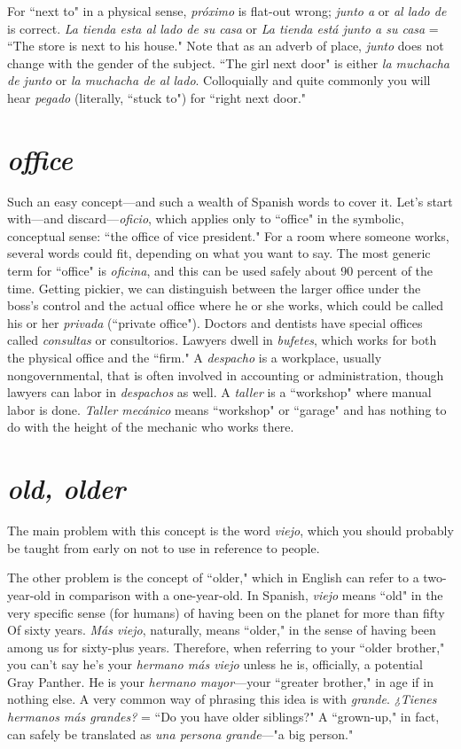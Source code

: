 For ``next to" in a physical sense, \emph{próximo} is flat-out wrong;
\emph{junto a} or \emph{al lado de} is correct. \emph{La tienda esta al lado de su casa} or \emph{La
tienda está junto a su casa} = ``The store is next to his house." Note
that as an adverb of place, \emph{junto} does not change with the gender of
the subject. ``The girl next door" is either \emph{la muchacha de junto} or \emph{la
muchacha de al lado}. Colloquially and quite commonly you will hear
\emph{pegado} (literally, ``stuck to") for ``right next door."

\section{\emph{office}}

Such an easy concept---and such a wealth of Spanish words to
cover it. Let's start with---and discard---\emph{oficio}, which applies only to
``office" in the symbolic, conceptual sense: ``the office of vice president." For a room where someone works, several words could fit, depending on what you want to say. The most generic term for ``office" is
\emph{oficina}, and this can be used safely about 90 percent of the time. Getting pickier, we can distinguish between the larger office under the
boss's control and the actual office where he or she works, which could
be called his or her \emph{privada} (``private office"). Doctors and dentists
have special offices called \emph{consultas} or consultorios. Lawyers dwell in
\emph{bufetes}, which works for both the physical office and the ``firm." A
\emph{despacho} is a workplace, usually nongovernmental, that is often involved in accounting or administration, though lawyers can labor in
\emph{despachos} as well. A \emph{taller} is a ``workshop" where manual labor is
done. \emph{Taller mecánico} means ``workshop" or ``garage" and has nothing
to do with the height of the mechanic who works there.

\section{\emph{old, older}}

The main problem with this concept is the word \emph{viejo}, which
you should probably be taught from early on not to use in reference
to people.

The other problem is the concept of ``older," which in English
can refer to a two-year-old in comparison with a one-year-old. In Spanish, \emph{viejo} means ``old" in the very specific sense (for humans) of having
been on the planet for more than fifty Of sixty years. \emph{Más viejo}, naturally, means ``older," in the sense of having been among us for sixty-plus years. Therefore, when referring to your ``older brother," you can't
say he's your \emph{hermano más viejo} unless he is, officially, a potential
Gray Panther. He is your \emph{hermano mayor}---your ``greater brother," in
age if in nothing else. A very common way of phrasing this idea is with
\emph{grande}. \emph{¿Tienes hermanos más grandes?} = ``Do you have older siblings?" A ``grown-up," in fact, can safely be translated as \emph{una persona
grande}---"a big person."

